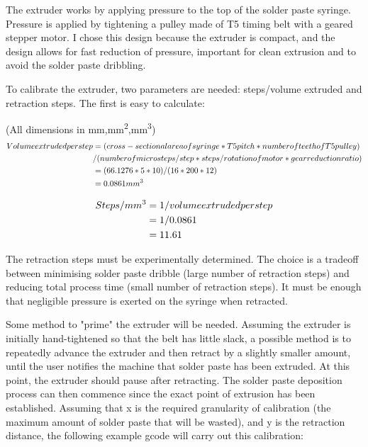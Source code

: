 \documentclass[a4paper,11pt]{article}  %
\begin{document}
The extruder works by applying pressure to the top of the solder paste syringe. Pressure is applied by tightening a pulley made
of T5 timing belt with a geared stepper motor. I chose this design because the extruder is compact, and the design allows for
fast reduction of pressure, important for clean extrusion and to avoid the solder paste dribbling. 

To calibrate the extruder, two parameters are needed: steps/volume extruded and retraction steps. The first is easy to calculate:

(All dimensions in mm,mm\textsuperscript{2},mm\textsuperscript{3})
\begin{align}
	Volume extruded per step &= (cross-sectional area of syringe * T5 pitch * number of teeth of T5 pulley) \\&/ (number of microsteps/step * steps/rotation of motor * gear reduction ratio)\\
	&= (66.1276*5*10)/(16*200*12)\\
	&= 0.0861 mm\textsuperscript{3}\\
\end{align}

\begin{align}					 
	Steps/mm\textsuperscript{3} &= 1 / volume extruded per step\\
	&= 1 / 0.0861\\
	&= 11.61\\
\end{align}

The retraction steps must be experimentally determined. The choice is a tradeoff between minimising solder paste dribble (large number
of retraction steps) and reducing total process time (small number of retraction steps). It must be enough that negligible pressure is
exerted on the syringe when retracted.

Some method to "prime" the extruder will be needed. Assuming the extruder is initially hand-tightened so that the belt has little slack,
a possible method is to repeatedly advance the extruder and then retract by a slightly smaller amount, until the user notifies the machine
that solder paste has been extruded. At this point, the extruder should pause after retracting. The solder paste deposition process can
then commence since the exact point of extrusion has been established. Assuming that x is the required granularity of calibration (the 
maximum amount of solder paste that will be wasted), and y is the retraction distance, the following example gcode will carry out this calibration:
\end{document}
